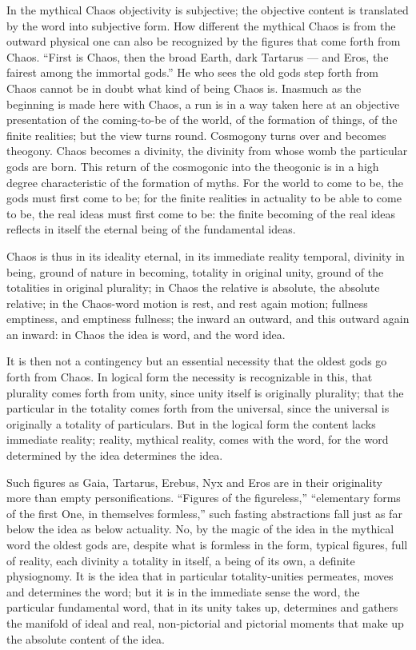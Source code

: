 \documentclass[12pt,a4paper,openany]{book}
\newcommand{\opage}[1]{\marginnote{\footnotesize\textit{[#1]}}}
\begin{document}
In the mythical Chaos objectivity is subjective; the objective content is translated by the word into subjective
form. How different the mythical Chaos is from the outward physical one can also be recognized by the figures that
come forth from Chaos. ``First is Chaos, then the broad Earth, dark Tartarus --- and Eros, the fairest among the
immortal gods.'' He who sees the old gods step forth from Chaos cannot be in doubt what kind of being Chaos is.
Inasmuch as the beginning is made here with Chaos, a run is in a way taken here at an objective presentation of the
coming-to-be of the world, of the formation of things, of the finite realities;
\opage{85}but the view turns round. Cosmogony turns over and becomes theogony. Chaos becomes a divinity, the divinity
from whose womb the particular gods are born. This return of the cosmogonic into the theogonic is in a high degree
characteristic of the formation of myths. For the world to come to be, the gods must first come to be; for the finite
realities in actuality to be able to come to be, the real ideas must first come to be: the finite becoming of the real
ideas reflects in itself the eternal being of the fundamental ideas.

Chaos is thus in its ideality eternal, in its immediate reality temporal, divinity in being, ground of nature in
becoming, totality in original unity, ground of the totalities in original plurality; in Chaos the relative is
absolute, the absolute relative; in the Chaos-word motion is rest, and rest again motion; fullness emptiness, and
emptiness fullness; the inward an outward, and this outward again an inward: in Chaos the idea is word, and the word
idea.

It is then not a contingency but an essential necessity that the oldest gods go forth from Chaos. In logical form the
necessity is recognizable in this, that plurality comes forth from unity, since unity itself is originally plurality;
that the particular in the totality comes forth from the universal, since the universal is originally a totality of
particulars. But in the logical form the content lacks immediate reality; reality, mythical reality, comes with the
word, for the word determined by the idea determines the idea.

Such figures as Gaia, Tartarus, Erebus, Nyx and Eros are in their originality more than empty personifications.
``Figures of the figureless,'' ``elementary forms of the first One, in themselves formless,'' such fasting
abstractions fall just as far below the idea as below actuality. No, by the magic of the idea in the mythical word the
oldest gods are, despite what is formless in the form, typical figures, full of reality, each divinity a totality in
itself,
\opage{86}a being of its own, a definite physiognomy. It is the idea that in particular totality-unities permeates,
moves and determines the word; but it is in the immediate sense the word, the particular fundamental word, that in its
unity takes up, determines and gathers the manifold of ideal and real, non-pictorial and pictorial moments that make
up the absolute content of the idea.
\end{document}
